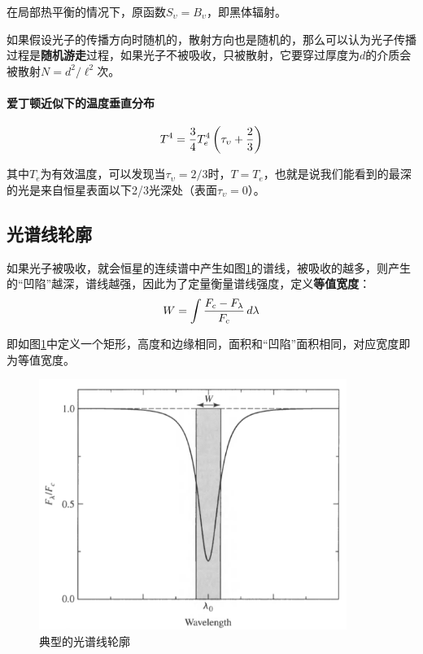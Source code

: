 \documentclass[openany]{ctexbook}
\begin{document}
在局部热平衡的情况下，原函数$S_\upsilon=B_\upsilon$，即黑体辐射。

如果假设光子的传播方向时随机的，散射方向也是随机的，那么可以认为光子传播过程是\textbf{随机游走}过程，如果光子不被吸收，只被散射，它要穿过厚度为$d$的介质会被散射$N=d^2/\ell^2$次。

\paragraph{爱丁顿近似下的温度垂直分布}
\begin{equation}
  T^4={3\over 4}T_e^4\left(\tau_\upsilon+{2\over3}\right)
\end{equation}

其中$T_e$为有效温度，可以发现当$\tau_\upsilon=2/3$时，$T=T_e$，也就是说我们能看到的最深的光是来自恒星表面以下2/3光深处（表面$\tau_\upsilon=0$）。

\subsection{光谱线轮廓}
如果光子被吸收，就会恒星的连续谱中产生如图\ref{fig:spectrum}的谱线，被吸收的越多，则产生的``凹陷''越深，谱线越强，因此为了定量衡量谱线强度，定义\textbf{等值宽度}：
\begin{equation}
  W=\int{\displaystyle F_c-F_\lambda \over \displaystyle F_c}\,d\lambda
\end{equation}

即如图\ref{fig:spectrum}中定义一个矩形，高度和边缘相同，面积和``凹陷''面积相同，对应宽度即为等值宽度。

\begin{figure}[hbt]
  \centering
  \includegraphics[width=10cm]{chapters/09/spectrum}
  \caption{典型的光谱线轮廓}
  \label{fig:spectrum}
\end{figure}
\end{document}
